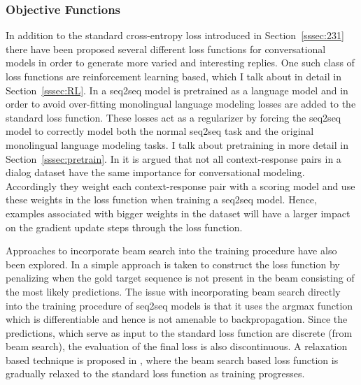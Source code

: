 \documentclass[12pt]{article}
\begin{document}
\subsubsection{Objective Functions} \label{sssec:functions}
In addition to the standard cross-entropy loss introduced in Section~\ref{sssec:231} there have been proposed several different loss functions for conversational models in order to generate more varied and interesting replies. One such class of loss functions are reinforcement learning based, which I talk about in detail in Section~\ref{sssec:RL}. In \cite{Ramachandran:2016} a seq2seq model is pretrained as a language model and in order to avoid over-fitting monolingual language modeling losses are added to the standard loss function. These losses act as a regularizer by forcing the seq2seq model to correctly model both the normal seq2seq task and the original monolingual language modeling tasks. I talk about pretraining in more detail in Section~\ref{sssec:pretrain}. In \cite{Lison:2017} it is argued that not all context-response pairs in a dialog dataset have the same importance for conversational modeling. Accordingly they weight each context-response pair with a scoring model and use these weights in the loss function when training a seq2seq model. Hence, examples associated with bigger weights in the dataset will have a larger impact on the gradient update steps through the loss function. 

Approaches to incorporate beam search into the training procedure have also been explored. In \cite{Wiseman:2016} a simple approach is taken to construct the loss function by penalizing when the gold target sequence is not present in the beam consisting of the most likely predictions. The issue with incorporating beam search directly into the training procedure of seq2seq models is that it uses the argmax function which is differentiable and hence is not amenable to backpropagation. Since the predictions, which serve as input to the standard loss function are discrete (from beam search), the evaluation of the final loss is also discontinuous. A relaxation based technique is proposed in \cite{Goyal:2017}, where the beam search based loss function is gradually relaxed to the standard loss function as training progresses.
\end{document}
